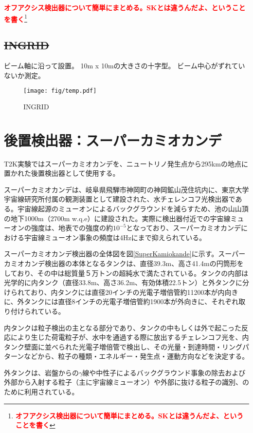 \documentclass[11pt]{jreport}
\newcommand{\figref}[1]{図\ref{#1}}
\newcommand{\red}[1]{\textcolor{red}{\textbf{#1}}}
\newcommand{\comment}[1]{\red{#1}\footnote{\red{#1}}}
\begin{document}
\comment{オフアクシス検出器について簡単にまとめる。SKとは違うんだよ、ということを書く}
\fi


\subsection{\sout{INGRID}}
ビーム軸に沿って設置。
10m x 10mの大きさの十字型。
ビーム中心がずれていないか測定。

\begin{figure}[htb]
\centering
\texttt{[image: fig/temp.pdf]}
\caption[INGRID]{INGRID}
\label{INGRID}
\end{figure}

\fi %


\newpage
\section{後置検出器：スーパーカミオカンデ}

T2K実験ではスーパーカミオカンデを、ニュートリノ発生点から295kmの地点に置かれた後置検出器として使用する。

スーパーカミオカンデは、岐阜県飛騨市神岡町の神岡鉱山茂住坑内に、東京大学宇宙線研究所付属の観測装置として建設された、水チェレンコフ光検出器である。宇宙線起源のミューオンによるバックグラウンドを減らすため、池の山山頂の地下1000m（2700m w.q.e）に建設された。実際に検出器付近での宇宙線ミューオンの強度は、地表での強度の約$10^{-5}$となっており、スーパーカミオカンデにおける宇宙線ミューオン事象の頻度は4Hzにまで抑えられている。

スーパーカミオカンデ検出器の全体図を\figref{SuperKamiokande}に示す。スーパーカミオカンデ検出器の本体となるタンクは、直径39.3m、高さ41.4mの円筒形をしており、その中は総質量５万トンの超純水で満たされている。タンクの内部は光学的に内タンク（直径33.8m、高さ36.2m、有効体積22.5トン）と外タンクに分けられており、内タンクには直径20インチの光電子増倍管約11200本が内向きに、外タンクには直径8インチの光電子増倍管約1900本が外向きに、それぞれ取り付けられている。

内タンクは粒子検出の主となる部分であり、タンクの中もしくは外で起こった反応により生じた荷電粒子が、水中を通過する際に放出するチェレンコフ光を、内タンク壁面に並べられた光電子増倍管で検出し、その光量・到達時間・リングパターンなどから、粒子の種類・エネルギー・発生点・運動方向などを決定する。

外タンクは、岩盤からの$\gamma$線や中性子によるバックグラウンド事象の除去および外部から入射する粒子（主に宇宙線ミューオン）や外部に抜ける粒子の識別、のために利用されている。
\end{document}

